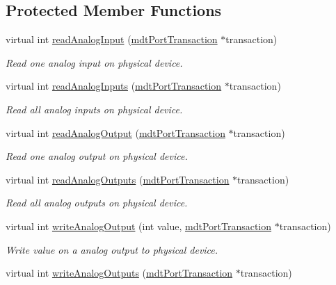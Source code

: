 \subsection*{Protected Member Functions}
\begin{DoxyCompactItemize}
\item 
virtual int \hyperlink{classmdt_device_acecf7934ce29b3a957accb0f4c98c746}{readAnalogInput} (\hyperlink{classmdt_port_transaction}{mdtPortTransaction} $\ast$transaction)
\begin{DoxyCompactList}\small\item\em Read one analog input on physical device. \end{DoxyCompactList}\item 
virtual int \hyperlink{classmdt_device_a40674e7bf0c367bb3edb407d73a5bd8e}{readAnalogInputs} (\hyperlink{classmdt_port_transaction}{mdtPortTransaction} $\ast$transaction)
\begin{DoxyCompactList}\small\item\em Read all analog inputs on physical device. \end{DoxyCompactList}\item 
virtual int \hyperlink{classmdt_device_a7934063c3f41a742515f1232c9598c2a}{readAnalogOutput} (\hyperlink{classmdt_port_transaction}{mdtPortTransaction} $\ast$transaction)
\begin{DoxyCompactList}\small\item\em Read one analog output on physical device. \end{DoxyCompactList}\item 
virtual int \hyperlink{classmdt_device_ab0232ac83c38bc93d3bc2aa91d94c291}{readAnalogOutputs} (\hyperlink{classmdt_port_transaction}{mdtPortTransaction} $\ast$transaction)
\begin{DoxyCompactList}\small\item\em Read all analog outputs on physical device. \end{DoxyCompactList}\item 
virtual int \hyperlink{classmdt_device_ae764634bba2b321ac2b4731c0353e45f}{writeAnalogOutput} (int value, \hyperlink{classmdt_port_transaction}{mdtPortTransaction} $\ast$transaction)
\begin{DoxyCompactList}\small\item\em Write value on a analog output to physical device. \end{DoxyCompactList}\item 
virtual int \hyperlink{classmdt_device_abc52b797df29945bf0a6358aab1b7245}{writeAnalogOutputs} (\hyperlink{classmdt_port_transaction}{mdtPortTransaction} $\ast$transaction)

\end{DoxyCompactItemize}
